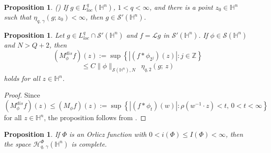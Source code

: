 \documentclass[oneside,10pt]{article}
\newtheorem{proposition}[theorem]{Proposition}
\begin{document}
\begin{proposition} (\cite[Proposition 4.7]{rocha3}) \label{g distrib}
If $g \in L^{q}_{loc}(\mathbb{H}^{n})$, $1 < q < \infty$, and there is a point $z_0 \in \mathbb{H}^{n}$ such that 
$\eta_{q, \, \gamma} (g ; z_0) < \infty$, then $g \in \mathcal{S}'(\mathbb{H}^{n})$.
\end{proposition}


\begin{proposition} \label{Lg dist} Let $g \in L^q_{loc} \cap \mathcal{S}'(\mathbb{H}^n)$ and 
$f = \mathcal{L} g$ in $\mathcal{S}'(\mathbb{H}^n)$. If $\phi \in \mathcal{S}(\mathbb{H}^n)$ and $N > Q+2$, then
\[
(M_{\phi}^{dis}f)(z) := \sup \left\{ |(f \ast \phi_{2^{j}})(z)| : j \in \mathbb{Z} \right\}  
\]
\[
\leq C \| \phi \|_{\mathcal{S}(\mathbb{H}^{n}), N}  \,\,\, \eta_{q, 2}(g; \, z)
\]
holds for all $z \in \mathbb{H}^n$.
\end{proposition}

\begin{proof} 
Since $(M_{\phi}^{dis}f)(z) \leq (M_{\phi} f)(z) := \sup \left\{ |(f \ast \phi_t)(w)| : \rho(w^{-1} \cdot z) < t, \, 0 < t < \infty \right\}$ for all $z \in \mathbb{H}^n$, the proposition follows from \cite[Proposition 4.8]{rocha3}.
\end{proof}

\begin{proposition} \label{cerrado} If $\Phi$ is an Orlicz function  with $0 < i(\Phi) \leq I(\Phi) < \infty$, then the space 
$\mathcal{H}^{\Phi}_{q, \, \gamma}(\mathbb{H}^{n})$ is complete.
\end{proposition}
\end{document}
